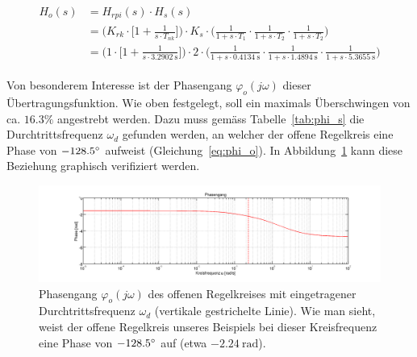 \begin{gather} \label{eq:pi:h_open}
    \begin{split}
        H_o (s) & = H_{rpi} (s) \cdot H_s (s) \\
            & = \Biggl(
                    K_{rk} \cdot \biggl[ 1 + \frac{1}{s \cdot T_{nk}} \biggr]
                \Biggr)
                \cdot
                K_s
                \cdot
                \Biggl(
                        \frac{1}{1 + s \cdot T_1}
                  \cdot \frac{1}{1 + s \cdot T_2}
                  \cdot \frac{1}{1 + s \cdot T_2}
                \Biggr) \\
            & = \Biggl(
                    1 \cdot \biggl[ 1 + \frac{1}{s \cdot \SI{3.2902}{\second}} \biggr]
                \Biggr)
                \cdot
                2
                \cdot
                \Biggl(
                          \frac{1}{1 + s \cdot \SI{0.4134}{\second}}
                    \cdot \frac{1}{1 + s \cdot \SI{1.4894}{\second}}
                    \cdot \frac{1}{1 + s \cdot \SI{5.3655}{\second}}
                \Biggr)
    \end{split}
\end{gather}


Von   besonderem    Interesse   ist   der    Phasengang   $\varphi_o(j\omega)$
dieser   \"Ubertragungsfunktion. Wie  oben   festgelegt,  soll   ein  maximals
\"Uberschwingen  von   ca. $16.3\%$  angestrebt  werden. Dazu   muss  gem\"ass
Tabelle~\ref{tab:phi_s}  die Durchtrittsfrequenz  $\omega_d$ gefunden  werden,
an  welcher der  offene  Regelkreis eine  Phase  von $-128.5\degree$  aufweist
(Gleichung~\ref{eq:phi_o}). In   Abbildung~\ref{fig:pi:omega_d}   kann   diese
Beziehung graphisch verifiziert werden.

\begin{figure}[h! width=\pagewidth]
    \includegraphics[width=\textwidth]{images/piOffenerRegelkreisPhasengang.png}
    \caption{%
        Phasengang   $\varphi_o(j\omega)$   des   offenen   Regelkreises   mit
        eingetragener Durchtrittsfrequenz $\omega_{d}$ (vertikale gestrichelte
        Linie). Wie man  sieht, weist der offene  Regelkreis unseres Beispiels
        bei dieser Kreisfrequenz eine Phase von $-128.5\degree$ auf
        (etwa $\SI{-2.24}{\radian}$).
    }
    \label{fig:pi:omega_d}
\end{figure}

